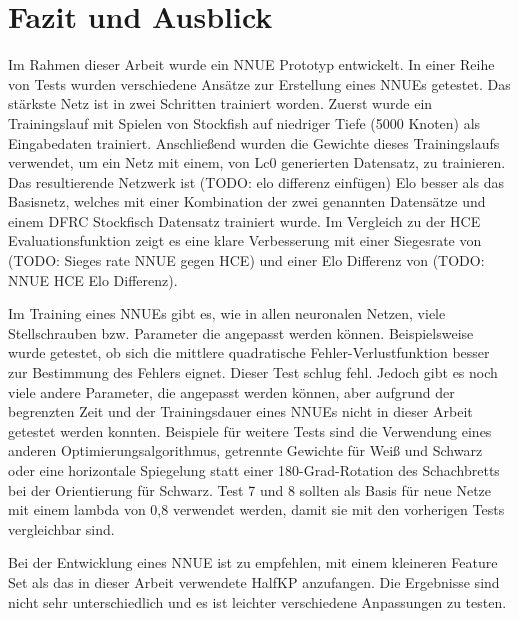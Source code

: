 \chapter{Fazit und Ausblick}

Im Rahmen dieser Arbeit wurde ein \ac{NNUE} Prototyp entwickelt. In einer Reihe von Tests wurden verschiedene Ansätze zur Erstellung eines \acp{NNUE} getestet. Das stärkste Netz ist in zwei Schritten trainiert worden. Zuerst wurde ein Trainingslauf mit Spielen von Stockfish auf niedriger Tiefe (5000 Knoten) als Eingabedaten trainiert. Anschließend wurden die Gewichte dieses Trainingslaufs verwendet, um ein Netz mit einem, von \ac{Lc0} generierten Datensatz, zu trainieren. Das resultierende Netzwerk ist (TODO: elo differenz einfügen) Elo besser als das Basisnetz, welches mit einer Kombination der zwei genannten Datensätze und einem \ac{DFRC} Stockfisch Datensatz trainiert wurde. Im Vergleich zu der \ac{HCE} Evaluationsfunktion zeigt es eine klare Verbesserung mit einer Siegesrate von (TODO: Sieges rate NNUE gegen HCE) und einer Elo Differenz von (TODO: NNUE HCE Elo Differenz). 

Im Training eines \acp{NNUE} gibt es, wie in allen neuronalen Netzen, viele Stellschrauben bzw. Parameter die angepasst werden können. Beispielsweise wurde getestet, ob sich die mittlere quadratische Fehler-Verlustfunktion besser zur Bestimmung des Fehlers eignet. Dieser Test schlug fehl. Jedoch gibt es noch viele andere Parameter, die angepasst werden können, aber aufgrund der begrenzten Zeit und der Trainingsdauer eines \acp{NNUE} nicht in dieser Arbeit getestet werden konnten. Beispiele für weitere Tests sind \zb{} die Verwendung eines anderen Optimierungsalgorithmus, getrennte Gewichte für Weiß und Schwarz oder eine horizontale Spiegelung statt einer 180-Grad-Rotation des Schachbretts bei der Orientierung für Schwarz. Test 7 und 8 sollten als Basis für neue Netze mit einem lambda von 0,8 verwendet werden, damit sie mit den vorherigen Tests vergleichbar sind.

Bei der Entwicklung eines \ac{NNUE} ist zu empfehlen, mit einem kleineren Feature Set als das in dieser Arbeit verwendete HalfKP anzufangen. Die Ergebnisse sind nicht sehr unterschiedlich und es ist leichter verschiedene Anpassungen zu testen.

